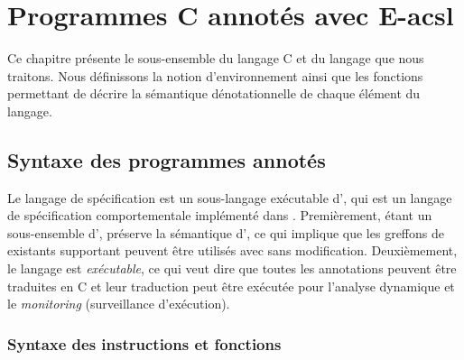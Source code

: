 
\chapter{Programmes C annotés avec E-acsl}
\label{sec:lang}

\chapterintro


Ce chapitre présente le sous-ensemble du langage C et du langage \eacsl que nous
traitons.
Nous définissons la notion d'environnement ainsi que les fonctions permettant de
décrire la sémantique dénotationnelle de chaque élément du langage.


\section{Syntaxe des programmes annotés}
\label{sec:lang-syntax}


Le langage de spécification \eacsl est un sous-langage exécutable d'\acsl, qui
est un langage de spécification comportementale implémenté dans \framac.
Premièrement, étant un sous-ensemble d'\acsl, \eacsl préserve la sémantique
d'\acsl, ce qui implique que les greffons de \framac existants supportant \acsl
peuvent être utilisés avec \eacsl sans modification.
Deuxièmement, le langage \eacsl est \textit{exécutable}, ce qui veut dire que
toutes les annotations peuvent être traduites en C et leur traduction peut être
exécutée pour l'analyse dynamique et le \textit{monitoring} (surveillance
d'exécution).


\subsection{Syntaxe des instructions et fonctions}



